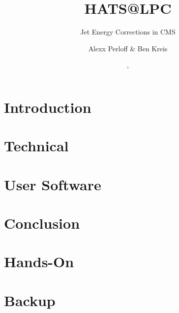 \documentclass[compress,10pt,usenames,dvipsnames]{Presentation} %
\title[HATS\@LPC]{HATS@LPC} %
\subtitle[JEC]{Jet Energy Corrections in CMS} %
\author[A. Perloff]{Alexx Perloff\inst{1} \& Ben Kreis\inst{2}} %
\institute[TAMU]
{
\begin{center}
  \inst{1}%
  Department of Physics and Astronomy\\
  Texas A{\&}M University\\
  \inst{2}%
  Fermilab\\
  \end{center}
}
\date{\dayofweekname{30}{06}{2016}, \displaydate{date}}
\begin{document}
\newlength{\residualSpace}


\section{Introduction}
\label{sec:introduction}


\section{Technical}
\label{sec:technical}


\section{User Software}
\label{sec:user_software}


\section{Conclusion}
\label{sec:conclusion}


\section{Hands-On}
\label{sec:hands_on}


\section*{Backup}
\label{sec:backup}

\end{document}
